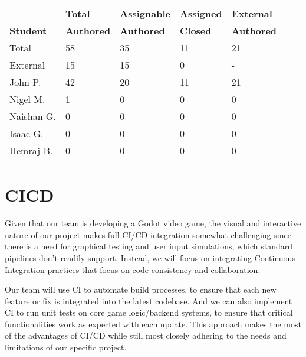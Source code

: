 \documentclass{article}
\begin{document}
\begin{table}[H]
\centering
\begin{tabular}{lllll}
\toprule
\textbf{ } & \textbf{Total} & \textbf{Assignable} & \textbf{Assigned} & \textbf{External}\\
\textbf{Student} & \textbf{Authored} & \textbf{Authored} & \textbf{Closed} & \textbf{Authored}\\
\midrule
Total & 58 & 35 & 11 & 21 \\
\midrule
External & 15 & 15 & 0 & - \\
John P. & 42 & 20 & 11 & 21 \\
Nigel M. & 1 & 0 & 0 & 0 \\
Naishan G. & 0 & 0 & 0 & 0 \\
Isaac G. & 0 & 0 & 0 & 0 \\
Hemraj B. & 0 & 0 & 0 & 0 \\
\bottomrule
\end{tabular}
\end{table}





\section{CICD}

Given that our team is developing a Godot video game, the visual and interactive nature of our project makes full CI/CD integration somewhat challenging since there is a need for graphical testing and user input simulations, which standard pipelines don’t readily support. Instead, we will focus on integrating Continuous Integration practices that focus on code consistency and collaboration.

Our team will use CI to automate build processes, to ensure that each new feature or fix is integrated into the latest codebase. And we can also implement CI to run unit tests on core game logic/backend systems, to ensure that critical functionalities work as expected with each update. This approach makes the most of the advantages of CI/CD while still most closely adhering to the needs and limitations of our specific project.
\end{document}
